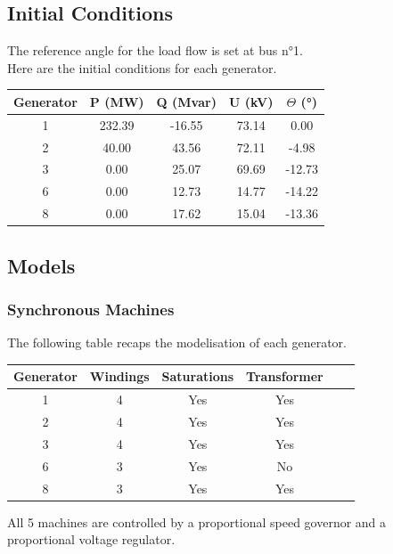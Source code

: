 \documentclass[a4paper, 12pt]{report}
\begin{document}
\subsection{Initial Conditions}

The reference angle for the load flow is set at bus n°1. \\

Here are the initial conditions for each generator.

\begin{center}
\begin{tabular}{|c|c|c|c|c|}
  \hline
  Generator & P (MW) & Q (Mvar) & U (kV) & $\Theta$ (°) \\
  \hline
  1 & 232.39 & -16.55 & 73.14 & 0.00\\
  2 & 40.00 & 43.56 & 72.11 & -4.98\\
  3 & 0.00 & 25.07 & 69.69 & -12.73\\
  6 & 0.00 & 12.73 & 14.77 & -14.22\\
  8 & 0.00 & 17.62 & 15.04 & -13.36\\
  \hline
\end{tabular}
\end{center}

\subsection{Models}
\label{ModelsIEEE}

\subsubsection{Synchronous Machines}

The following table recaps the modelisation of each generator.

\begin{center}
\begin{tabular}{|c|c|c|c|c|c|}
  \hline
  Generator & Windings  & Saturations & Transformer\\
  \hline
  1 & 4 & Yes & Yes\\
  2 & 4 & Yes & Yes\\
  3 & 4 & Yes & Yes\\
  6 & 3 & Yes & No\\
  8 & 3 & Yes & Yes\\
  \hline
\end{tabular}
\end{center}

All 5 machines are controlled by a proportional speed governor and a proportional voltage regulator. \\
\end{document}
